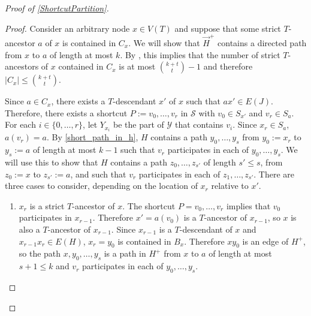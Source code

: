 \documentclass{patmorin}
\theoremstyle{plain}
\theoremstyle{definition}
\renewcommand{\SS}{\mathcal{S}}
\renewcommand{\le}{\leqslant}
\begin{document}
\begin{proof}[Proof of \cref{ShortcutPartition}]
\begin{proof}
  Consider an arbitrary node $x\in V(T)$ and suppose that some strict $T$-ancestor $a$ of $x$ is contained in $C_x$.  We will show that $\overrightarrow{H}^+$ contains a directed path from $x$ to $a$ of length at most $k$.  By \cite[Lemma~13]{PS21}, this implies that the number of strict $T$-ancestors of $x$ contained in $C_x$ is at most $\binom{k+t}{t}-1$ and therefore $|C_x|\le\binom{k+t}{t}$.

  Since $a\in C_x$, there exists a $T$-descendant $x'$ of $x$ such that $ax'\in E(J)$.  Therefore, there exists a shortcut $P:=v_0,\ldots,v_r$ in $\SS$ with $v_0\in S_{x'}$ and $v_r\in S_a$.  For each $i\in\{0,\ldots,r\}$, let $Y_{x_i}$ be the part of $\mathcal{Y}$ that contains $v_i$. Since $x_r\in S_{a}$, $a(v_r)=a$.  By \cref{short_path_in_h}, $H$ contains a path $y_0,\ldots,y_s$ from $y_0:=x_r$ to $y_s:=a$ of length at most $k-1$ such that $v_r$ participates in each of $y_0,\ldots,y_s$.  We will use this to show that $H$ contains a path $z_0,\ldots,z_{s'}$ of length $s'\le s$, from $z_0:=x$ to $z_{s'}:=a$, and such that $v_r$ participates in each of $z_1,\ldots,z_{s'}$.   There are three cases to consider, depending on the location of $x_r$ relative to $x'$.


  \begin{enumerate}
    \item $x_r$ is a strict $T$-ancestor of $x$.  The shortcut $P=v_0,\ldots,v_r$ implies that $v_0$ participates in $x_{r-1}$.  Therefore $x'=a(v_0)$ is a $T$-ancestor of $x_{r-1}$, so $x$ is also a $T$-ancestor of $x_{r-1}$.  Since $x_{r-1}$ is a $T$-descendant of $x$ and $x_{r-1}x_r\in E(H)$, $x_r=y_0$ is contained in $B_x$. Therefore $xy_0$ is an edge of $H^+$, so the path $x,y_0,\ldots,y_s$ is a path in $H^+$ from $x$ to $a$ of length at most $s+1\le k$ and $v_r$ participates in each of $y_0,\ldots,y_s$.


\end{enumerate}
\end{proof}
\end{proof}
\end{document}
